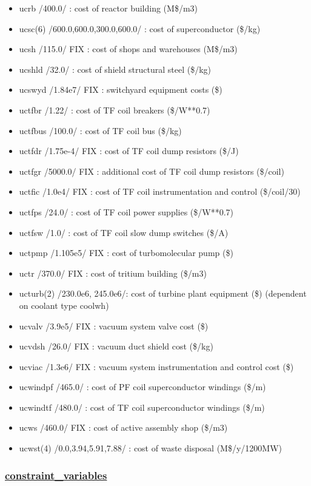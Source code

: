 \documentclass[]{article}
\begin{document}
\begin{itemize}
\item
  ucrb /400.0/ : cost of reactor building (M\$/m3)
\item
  ucsc(6) /600.0,600.0,300.0,600.0/ : cost of superconductor (\$/kg)
\item
  ucsh /115.0/ FIX : cost of shops and warehouses (M\$/m3)
\item
  ucshld /32.0/ : cost of shield structural steel (\$/kg)
\item
  ucswyd /1.84e7/ FIX : switchyard equipment costs (\$)
\item
  uctfbr /1.22/ : cost of TF coil breakers (\$/W**0.7)
\item
  uctfbus /100.0/ : cost of TF coil bus (\$/kg)
\item
  uctfdr /1.75e-4/ FIX : cost of TF coil dump resistors (\$/J)
\item
  uctfgr /5000.0/ FIX : additional cost of TF coil dump resistors
  (\$/coil)
\item
  uctfic /1.0e4/ FIX : cost of TF coil instrumentation and control
  (\$/coil/30)
\item
  uctfps /24.0/ : cost of TF coil power supplies (\$/W**0.7)
\item
  uctfsw /1.0/ : cost of TF coil slow dump switches (\$/A)
\item
  uctpmp /1.105e5/ FIX : cost of turbomolecular pump (\$)
\item
  uctr /370.0/ FIX : cost of tritium building (\$/m3)
\item
  ucturb(2) /230.0e6, 245.0e6/: cost of turbine plant equipment (\$)
  (dependent on coolant type coolwh)
\item
  ucvalv /3.9e5/ FIX : vacuum system valve cost (\$)
\item
  ucvdsh /26.0/ FIX : vacuum duct shield cost (\$/kg)
\item
  ucviac /1.3e6/ FIX : vacuum system instrumentation and control cost
  (\$)
\item
  ucwindpf /465.0/ : cost of PF coil superconductor windings (\$/m)
\item
  ucwindtf /480.0/ : cost of TF coil superconductor windings (\$/m)
\item
  ucws /460.0/ FIX : cost of active assembly shop (\$/m3)
\item
  ucwst(4) /0.0,3.94,5.91,7.88/ : cost of waste disposal (M\$/y/1200MW)
\end{itemize}

\subsubsection{\href{constraint_variables.html}{constraint\_variables}}
\end{document}
